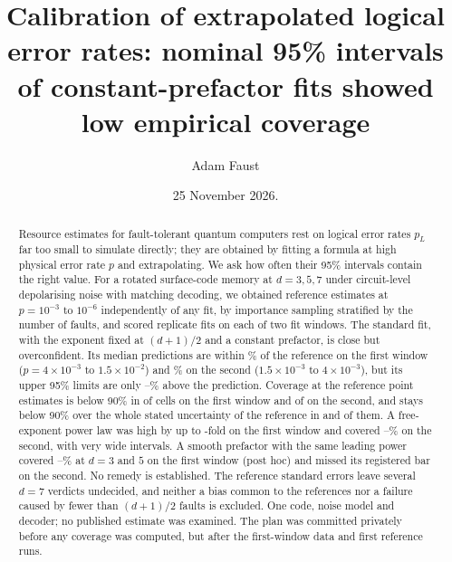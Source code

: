 \documentclass[aps,pre,twocolumn,superscriptaddress,nofootinbib,10pt]{revtex4-2}
\newcommand{\pL}{p_L}
\newif\ifdraftmark
\begin{document}
\title{Calibration of extrapolated logical error rates: nominal 95\% intervals of constant-prefactor fits showed low empirical coverage}

\author{Adam Faust}
\date{\ifdraftmark DRAFT v14, not for distribution. \fi 25 November 2026.}

\begin{abstract}
Resource estimates for fault-tolerant quantum computers rest on logical error rates $\pL$ far too small to simulate directly; they are obtained by fitting a formula at high physical error rate $p$ and extrapolating. We ask how often their 95\% intervals contain the right value. For a rotated surface-code memory at $d=3,5,7$ under circuit-level depolarising noise with matching decoding, we obtained reference estimates at $p=10^{-3}$ to $10^{-6}$ independently of any fit, by importance sampling stratified by the number of faults, and scored  replicate fits on each of two fit windows. The standard fit, with the exponent fixed at $(d+1)/2$ and a constant prefactor, is close but overconfident. Its median predictions are within \% of the reference on the first window ($p=4\times10^{-3}$ to $1.5\times10^{-2}$) and \% on the second ($1.5\times10^{-3}$ to $4\times10^{-3}$), but its upper 95\% limits are only --\% above the prediction. Coverage at the reference point estimates is below 90\% in  of  cells on the first window and  of  on the second, and stays below 90\% over the whole stated uncertainty of the reference in  and  of them. A free-exponent power law was high by up to -fold on the first window and covered --\% on the second, with very wide intervals. A smooth prefactor with the same leading power covered --\% at $d=3$ and $5$ on the first window (post hoc) and missed its registered bar on the second. No remedy is established. The reference standard errors leave several $d=7$ verdicts undecided, and neither a bias common to the references nor a failure caused by fewer than $(d+1)/2$ faults is excluded. One code, noise model and decoder; no published estimate was examined. The plan was committed privately before any coverage was computed, but after the first-window data and first reference runs.
\end{abstract}
\end{document}
